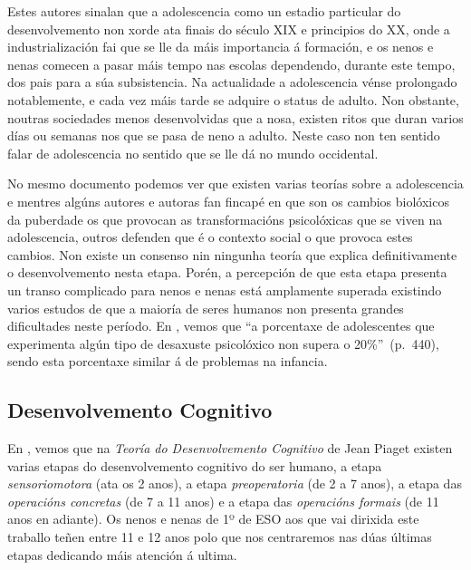 Estes autores sinalan que a adolescencia como un estadio particular do desenvolvemento non xorde ata finais do século XIX e principios do XX, onde a industrialización fai que se lle da máis importancia á formación, e os nenos e nenas comecen a pasar máis tempo nas escolas dependendo, durante este tempo, dos pais para a súa subsistencia. Na actualidade a adolescencia vénse prolongado notablemente, e cada vez máis tarde se adquire o status de adulto. Non obstante, noutras sociedades menos desenvolvidas que a nosa, existen ritos que duran varios días ou semanas nos que se pasa de neno a adulto. Neste caso non ten sentido falar de adolescencia no sentido que se lle dá no mundo occidental.

No mesmo documento podemos ver que existen varias teorías sobre a adolescencia e mentres algúns autores e autoras fan fincapé en que son os cambios biolóxicos da puberdade os que provocan as transformacións psicolóxicas que se viven na adolescencia, outros defenden que é o contexto social o que provoca estes cambios. Non existe un consenso nin ningunha teoría que explica definitivamente o desenvolvemento nesta etapa. Porén, a percepción de que esta etapa presenta un transo complicado para nenos e nenas está amplamente superada existindo varios estudos de que a maioría de seres humanos non presenta grandes dificultades neste período. En , vemos que ``a porcentaxe de adolescentes que experimenta algún tipo de desaxuste psicolóxico non supera o 20\%''~(p.~440), sendo esta porcentaxe similar á de problemas na infancia.

\subsection{Desenvolvemento Cognitivo}
En , vemos que na \emph{Teoría do Desenvolvemento Cognitivo} de Jean Piaget existen varias etapas do desenvolvemento cognitivo do ser humano, a etapa \emph{sensoriomotora} (ata os 2 anos), a etapa \emph{preoperatoria} (de 2 a 7 anos), a etapa das \emph{operacións concretas} (de 7 a 11 anos) e a etapa das \emph{operacións formais} (de 11 anos en adiante). Os nenos e nenas de 1º de ESO aos que vai dirixida este traballo teñen entre 11 e 12 anos polo que nos centraremos nas dúas últimas etapas dedicando máis atención á ultima.

